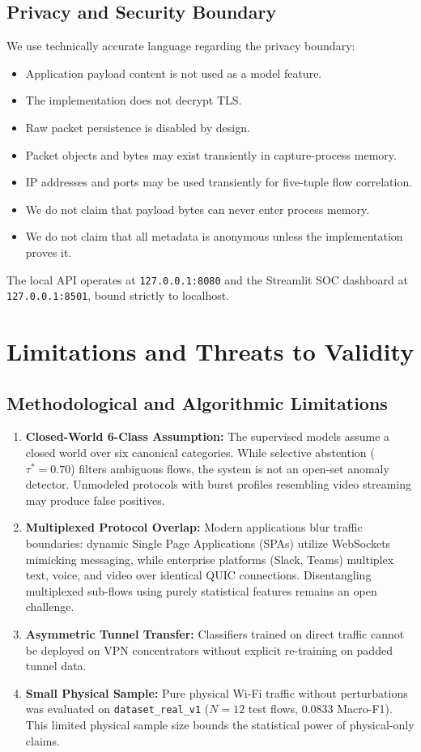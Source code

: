 \documentclass[conference]{IEEEtran}
\begin{document}
\subsection{Privacy and Security Boundary}
We use technically accurate language regarding the privacy boundary:
\begin{itemize}
    \item Application payload content is not used as a model feature.
    \item The implementation does not decrypt TLS.
    \item Raw packet persistence is disabled by design.
    \item Packet objects and bytes may exist transiently in capture-process memory.
    \item IP addresses and ports may be used transiently for five-tuple flow correlation.
    \item We do not claim that payload bytes can never enter process memory.
    \item We do not claim that all metadata is anonymous unless the implementation proves it.
\end{itemize}
The local API operates at \texttt{127.0.0.1:8080} and the Streamlit SOC dashboard at \texttt{127.0.0.1:8501}, bound strictly to localhost.

\section{Limitations and Threats to Validity}
\label{sec:limitations}

\subsection{Methodological and Algorithmic Limitations}
\begin{enumerate}
    \item \textbf{Closed-World 6-Class Assumption:} The supervised models assume a closed world over six canonical categories. While selective abstention ($\tau^* = 0.70$) filters ambiguous flows, the system is not an open-set anomaly detector. Unmodeled protocols with burst profiles resembling video streaming may produce false positives.
    \item \textbf{Multiplexed Protocol Overlap:} Modern applications blur traffic boundaries: dynamic Single Page Applications (SPAs) utilize WebSockets mimicking messaging, while enterprise platforms (Slack, Teams) multiplex text, voice, and video over identical QUIC connections. Disentangling multiplexed sub-flows using purely statistical features remains an open challenge.
    \item \textbf{Asymmetric Tunnel Transfer:} Classifiers trained on direct traffic cannot be deployed on VPN concentrators without explicit re-training on padded tunnel data.
    \item \textbf{Small Physical Sample:} Pure physical Wi-Fi traffic without perturbations was evaluated on \texttt{dataset\_real\_v1} ($N=12$ test flows, 0.0833 Macro-F1). This limited physical sample size bounds the statistical power of physical-only claims.
\end{enumerate}
\end{document}
